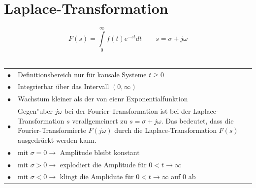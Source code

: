 \newpage
\section{Laplace-Transformation}
	$$\boxed{F(s)=\int\limits_0^\infty f(t)e^{-st}dt} \qquad s=\sigma+j\omega$$\\
	\begin{tabular}{p{1cm}p{17cm}}
		$\bullet$ & Definitionsbereich nur für kausale Systeme $t\geq 0$\\
		$\bullet$ & Integrierbar über das Intervall $(0,\infty)$\\
		$\bullet$ & Wachstum kleiner als der von eienr Exponentialfunktion\\ 
		$\bullet$ & Gegen"uber $j\omega$ bei der Fourier-Transformation ist bei der
			Laplace-Transformation $s$ verallgemeinert zu $s=\sigma + j\omega$. Das
			bedeutet, dass die Fourier-Transformierte $F(j\omega)$ durch die
			Laplace-Transformation $F(s)$ ausgedr\"uckt werden kann. \\
		$\bullet$ & mit $\sigma = 0 \rightarrow$ Amplitude bleibt konstant\\
		$\bullet$ & mit $\sigma > 0 \rightarrow$ explodiert die Amplitude f\"ur $0 < t \rightarrow \infty$ \\
		$\bullet$ & mit $\sigma < 0 \rightarrow$ klingt die Amplidute für $0 < t \rightarrow \infty$ auf $0$ ab
	\end{tabular}
	
